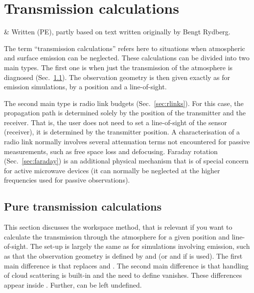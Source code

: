 \chapter{Transmission calculations}
 \label{sec:trans}

 & Written (PE), partly based on text written originally by 
          Bengt Rydberg.
\stophistory

\graphicspath{{Figs/transmission/}}

The term ``transmission calculations'' refers here to situations when
atmospheric and surface emission can be neglected. These calculations can be
divided into two main types. The first one is when just the transmission of the
atmosphere is diagnosed (Sec.~\ref{sec:transmission}). The observation geometry
is then given exactly as for emission simulations, by a position and a
line-of-sight.

The second main type is radio link budgets (Sec.~\ref{sec:rlinks}). For this
case, the propagation path is determined solely by the position of the
transmitter and the receiver. That is, the user does not need to set a
line-of-sight of the sensor (receiver), it is determined by the transmitter
position. A characterisation of a radio link normally involves several
attenuation terms not encountered for passive measurements, such as free space
loss and defocusing. Faraday rotation (Sec.~\ref{sec:faraday}) is an additional
physical mechanism that is of special concern for active microwave devices (it
can normally be neglected at the higher frequencies used for passive
observations).




\section{Pure transmission calculations}
\label{sec:transmission}

This section discusses the  workspace method,
that is relevant if you want to calculate the transmission through the
atmosphere for a given position and line-of-sight. The set-up is largely the
same as for simulations involving emission, such as that the observation
geometry is defined by  and  (or
 and  if  is used).
The first main difference is that  replaces
 and . The second
main difference is that handling of cloud scattering is built-in and the need
to define  vanishes. These differences appear
inside . Further,
 can be left undefined.

